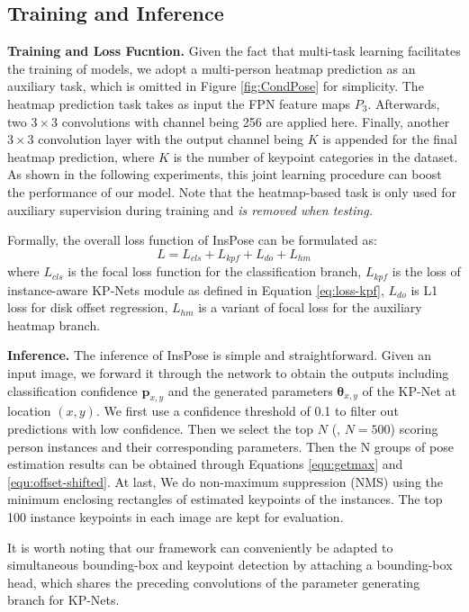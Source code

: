\documentclass[sigconf]{acmart}
\begin{document}
\subsection{Training and Inference}

\textbf{Training and Loss Fucntion.}\quad
Given the fact that multi-task learning facilitates the training of models, we adopt a multi-person heatmap prediction as an auxiliary task, which is omitted in Figure \ref{fig:CondPose} for simplicity.
The heatmap prediction task takes as input the FPN feature maps $P_{3}$. Afterwards, two $3 \times 3$ convolutions with channel being 256 are applied here. Finally, another $3 \times 3$ convolution layer with the output channel being $K$ is appended for the final heatmap prediction, where $K$ is the number of keypoint categories in the dataset. 
As shown in the following experiments, this joint learning procedure can boost the performance of our model. 
Note that the heatmap-based task is only used for auxiliary supervision during training and \textit{is removed when testing.}

Formally, the overall loss function of InsPose can be formulated as:
\begin{equation}
  L = L_{cls} + L_{kpf} + L_{do} + L_{hm}
\end{equation}
where $L_{cls}$ is the focal loss function \cite{lin2017focal} for the classification branch, $L_{kpf}$ is the loss of instance-aware KP-Nets module as defined in Equation \eqref{eq:loss-kpf}, $L_{do}$ is L1 loss for disk offset regression, $L_{hm}$ is a variant of focal loss \cite{law2018cornernet} for the auxiliary heatmap branch.

\textbf{Inference.}\quad
The inference of InsPose is simple and straightforward. Given an input image, we forward it through the network to obtain the outputs including classification confidence $\bm{p}_{x,y}$ and the generated parameters $\bm{\theta}_{x,y}$ of the KP-Net at location $(x,y)$.
We first use a confidence threshold of 0.1 to filter out predictions with low confidence. Then we select the top $N$ (, $N=500$) scoring person instances and their corresponding parameters. Then the N groups of pose estimation results can be obtained through Equations \eqref{equ:getmax} and \eqref{equ:offset-shifted}.
At last, We do non-maximum suppression (NMS) using the minimum enclosing rectangles of estimated keypoints of the instances.
The top 100 instance keypoints in each image are kept for evaluation.

It is worth noting that our framework can conveniently be adapted to simultaneous bounding-box and keypoint detection by attaching a  bounding-box head, which shares the preceding convolutions of the parameter generating branch for KP-Nets.
\end{document}

